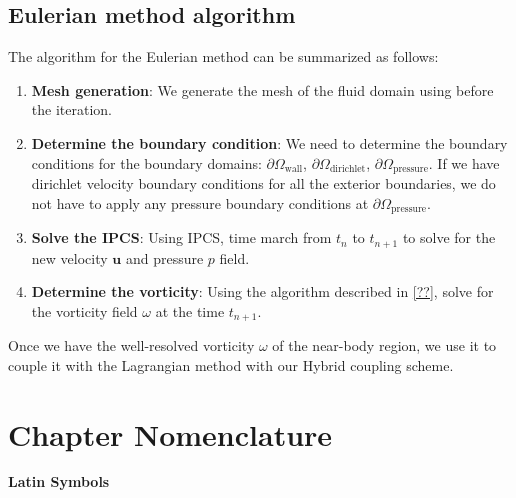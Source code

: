 \subsection*{Eulerian method algorithm}

The algorithm for the Eulerian method can be summarized as follows:

	\begin{enumerate}
	\item \textbf{Mesh generation}: We generate the mesh of the fluid domain using \gmsh before the iteration.
	\item \textbf{Determine the boundary condition}: We need to determine the boundary conditions for the boundary domains: $\partial \Omega_{\mathrm{wall}}$, $\partial \Omega_{\mathrm{dirichlet}}$, $\partial \Omega_{\mathrm{pressure}}$. If we have dirichlet velocity boundary conditions for all the exterior boundaries, we do not have to apply any pressure boundary conditions at $\partial \Omega_{\mathrm{pressure}}$.
	\item \textbf{Solve the IPCS}: Using IPCS, time march from $t_n$ to $t_{n+1}$ to solve for the new velocity $\mathbf{u}$ and pressure $p$ field.
	\item \textbf{Determine the vorticity}: Using the algorithm described in \ref{??}, solve for the vorticity field $\omega$ at the time $t_{n+1}$. 
	\end{enumerate}

Once we have the well-resolved vorticity $\omega$ of the near-body region, we use it to couple it with the Lagrangian method with our Hybrid coupling scheme.

\section{Chapter Nomenclature}

{\textbf{\textsf{Latin Symbols}}}

